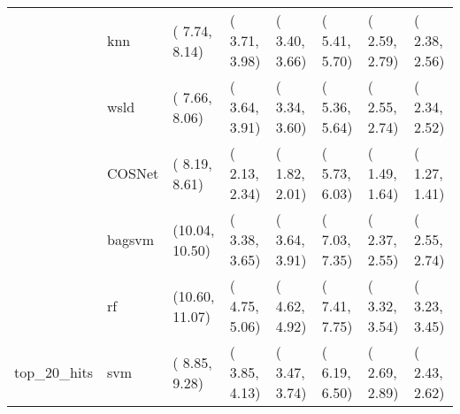 \begin{table}[H]
{\begin{tabular}{llllllll}
 & knn & ( 7.74,  8.14) & ( 3.71,  3.98) & ( 3.40,  3.66) & ( 5.41,  5.70) & ( 2.59,  2.79) & ( 2.38,  2.56)\\

 & wsld & ( 7.66,  8.06) & ( 3.64,  3.91) & ( 3.34,  3.60) & ( 5.36,  5.64) & ( 2.55,  2.74) & ( 2.34,  2.52)\\

 & COSNet & ( 8.19,  8.61) & ( 2.13,  2.34) & ( 1.82,  2.01) & ( 5.73,  6.03) & ( 1.49,  1.64) & ( 1.27,  1.41)\\

 & bagsvm & (10.04, 10.50) & ( 3.38,  3.65) & ( 3.64,  3.91) & ( 7.03,  7.35) & ( 2.37,  2.55) & ( 2.55,  2.74)\\

 & rf & (10.60, 11.07) & ( 4.75,  5.06) & ( 4.62,  4.92) & ( 7.41,  7.75) & ( 3.32,  3.54) & ( 3.23,  3.45)\\

\multirow{-15}{*}{\raggedright\arraybackslash top\_20\_hits} & svm & ( 8.85,  9.28) & ( 3.85,  4.13) & ( 3.47,  3.74) & ( 6.19,  6.50) & ( 2.69,  2.89) & ( 2.43,  2.62)\\
\bottomrule
\end{tabular}}
\end{table}
